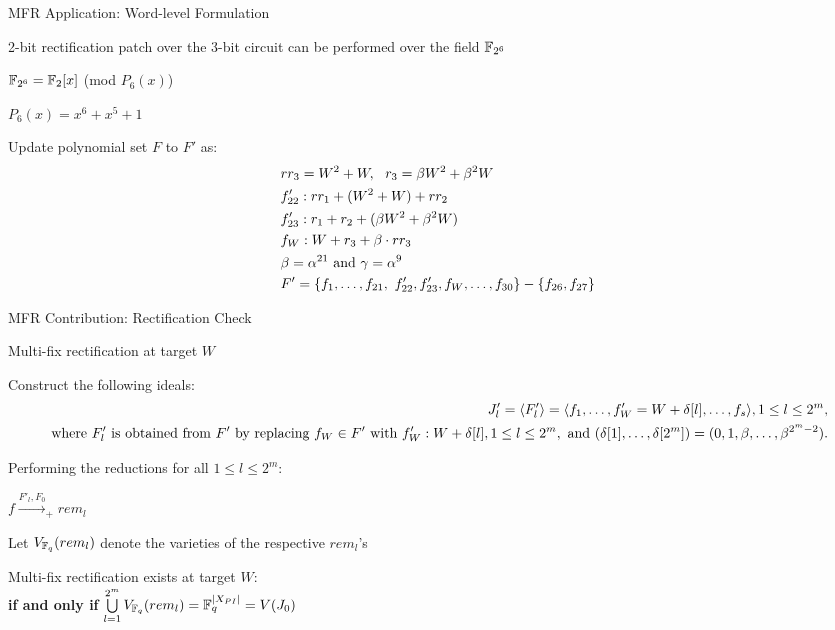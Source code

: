 \begin{frame}{\large MFR Application: Word-level Formulation }
\bi
	\item 2-bit rectification patch over the 3-bit circuit can be performed over the field ${\mathbb{F}}_{2^6}$
	\bi
		\item ${\mathbb{F}}_{2^6} = {\mathbb{F}}_2[x]$ (mod $P_6(x)$)
		\item $P_6(x) = x^6+x^5+1$

	\ei
	\vspace{0.1in}
	\item Update polynomial set $F$ to $F'$ as:
	\begin{align*}
		&rr_3= W^2+W,~~r_3 = \beta W^2 +\beta^2W \\
		&f'_{22}:rr_1  + (W^2+W) + rr_2\\
		&f'_{23}:r_1 + r_2 + (\beta W^2 +\beta^2 W)\\
		&f_W:W + r_3 + \beta \cdot rr_3\\     
		&\beta=\alpha^{21} \text{ and } \gamma=\alpha^9 \\
		&F'=\{f_1,\dots,f_{21},~f'_{22},f'_{23},f_W,\dots,f_{30}\}-\{f_{26},f_{27}\}
	\end{align*}
\ei
\end{frame}

\begin{frame}{\large MFR Contribution: Rectification Check}
\bi
	\item Multi-fix rectification at target $W$
	\vspace{0.1in}
	\bi
		\item Construct the following ideals:
		\begin{align*}
			J'_l = \langle F'_l\rangle =\langle f_1,\dots,f'_W=W+\delta[l],\dots,f_s\rangle,1 \leq l \leq 2^m, \\
			\text{ where $F'_l$ is obtained from $F'$ by replacing } 
			f_W \in F' \text{ with } f'_W: W + \delta[l], 1\leq l \leq 2^m,
  			\text{ and } (\delta[1],\dots,\delta[2^{m}]) =(0,1,\beta,\dots,\beta^{2^m-2}).
		\end{align*}
		\vspace{0.1in}
		\item Performing the reductions for all $1 \leq l \leq 2^m$: 
		\bi
			\item $f\xrightarrow{F'_l, F_0}_+rem_l $
		\ei
		\item Let $V_{{\mathbb{F}}_{q}}(rem_l)$ denote the varieties of the respective $rem_l$'s
		\vspace{0.1in}
		\item Multi-fix rectification exists at target $W$: \\  
				\centering
				{\bf if and only if} $\bigcup\limits_{l=1}^{2^m}V_{{\mathbb{F}}_{q}}(rem_l) = {\mathbb{F}}_{q}^{|X_{PI}|} = V(J_0)$
	\ei
\ei
\end{frame}

